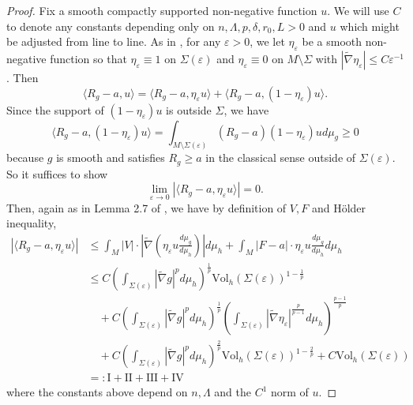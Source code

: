 \documentclass[12pt]{amsart}
\newcommand{\hdel}{\tilde{\nabla}}
\theoremstyle{remark}
\numberwithin{equation}{section}
\begin{document}
\begin{proof}
Fix a smooth compactly supported non-negative  function $u$. 
We will use $C$ to denote any constants depending only on $n,\Lambda,p,\delta,r_0,L>0$ and $u$ which might be adjusted from line to line.  As in \cite{jiang_removable_2022}, for any $\varepsilon > 0$, we let $\eta_\varepsilon$ be a smooth non-negative function so that $\eta_\varepsilon \equiv 1$ on $\Sigma(\varepsilon)$ and $\eta_\varepsilon \equiv 0$ on $M\setminus\Sigma$ with $|\hdel \eta_\varepsilon|\leq C\varepsilon^{-1}$. Then
    \begin{equation*}
        \langle R_{g} - a, u\rangle = \langle R_g - a, \eta_\varepsilon u\rangle + \langle R_g - a, (1-\eta_\varepsilon)u\rangle.
    \end{equation*}
    Since the support of $(1-\eta_\varepsilon)u$ is outside $\Sigma$, we have
    \begin{equation*}
        \langle R_g - a, (1-\eta_\varepsilon)u\rangle = \int_{M\setminus \Sigma(\varepsilon)} (R_g - a)(1-\eta_\varepsilon)u d\mu_g \geq 0
    \end{equation*}
    because $g$ is smooth and satisfies $R_g \geq a$ in the classical sense outside of $\Sigma(\varepsilon)$. So it suffices to show
    \begin{equation*}
        \lim\limits_{\varepsilon \to 0}\left|\langle R_g - a,\eta_\varepsilon u\rangle\right| = 0.
    \end{equation*}
    Then, again as in Lemma 2.7 of \cite{jiang_removable_2022}, we have by definition of $V, F$ and H\"older inequality,
    \begin{align}\label{eqn:distributional-scalar-curvature-integral-estimate}
        \left|\langle R_g - a,\eta_\varepsilon u\rangle\right| & \leq \int_M |V| \cdot \left| \hdel \left(\eta_\varepsilon u \frac{d\mu_g}{d\mu_h}\right)\right| d\mu_h + \int_M |F - a|\cdot \eta_\varepsilon u \frac{d\mu_g}{d\mu_h}d\mu_h \nonumber \\
        &\leq C\left(\int_{\Sigma(\varepsilon)}|\hdel g|^pd\mu_h\right)^\frac{1}{p}\text{Vol}_h(\Sigma(\varepsilon))^{1-\frac{1}{p}} \nonumber \\
        &\quad + C\left(\int_{\Sigma(\varepsilon)}|\hdel g|^pd\mu_h\right)^\frac{1}{p}\left(\int_{\Sigma(\varepsilon)}|\hdel\eta_\varepsilon|^\frac{p}{p-1}d\mu_h\right)^\frac{p-1}{p} \nonumber \\
        &\quad + C\left(\int_{\Sigma(\varepsilon)}|\hdel g|^pd\mu_h\right)^\frac{2}{p}\text{Vol}_h(\Sigma(\varepsilon))^{1-\frac{2}{p}} + C\text{Vol}_h(\Sigma(\varepsilon)) \nonumber \\
        &=: \text{I} + \text{II} + \text{III} + \text{IV}
    \end{align}
    where the constants above depend on $n,\Lambda$ and the $C^1$ norm of $u$.
    

\end{proof}
\end{document}
